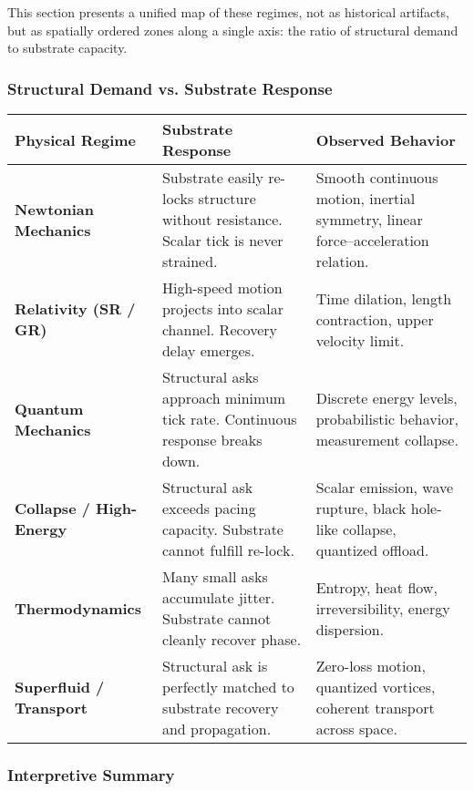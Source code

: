 \documentclass[entropy,article,submit,pdftex,moreauthors]{Definitions/mdpi}
\begin{document}
This section presents a unified map of these regimes, not as historical artifacts, but as spatially ordered zones along a single axis: the ratio of structural demand to substrate capacity.

\subsubsection*{Structural Demand vs. Substrate Response}

\begin{center}
\renewcommand{\arraystretch}{1.4}
\begin{tabular}{|p{3.3cm}|p{4.0cm}|p{5.0cm}|}
\hline
\textbf{Physical Regime} & \textbf{Substrate Response} & \textbf{Observed Behavior} \\
\hline
\textbf{Newtonian Mechanics} & Substrate easily re-locks structure without resistance. Scalar tick is never strained. & Smooth continuous motion, inertial symmetry, linear force–acceleration relation. \\
\hline
\textbf{Relativity (SR / GR)} & High-speed motion projects into scalar channel. Recovery delay emerges. & Time dilation, length contraction, upper velocity limit. \\
\hline
\textbf{Quantum Mechanics} & Structural asks approach minimum tick rate. Continuous response breaks down. & Discrete energy levels, probabilistic behavior, measurement collapse. \\
\hline
\textbf{Collapse / High-Energy} & Structural ask exceeds pacing capacity. Substrate cannot fulfill re-lock. & Scalar emission, wave rupture, black hole-like collapse, quantized offload. \\
\hline
\textbf{Thermodynamics} & Many small asks accumulate jitter. Substrate cannot cleanly recover phase. & Entropy, heat flow, irreversibility, energy dispersion. \\
\hline
\textbf{Superfluid / Transport} & Structural ask is perfectly matched to substrate recovery and propagation. & Zero-loss motion, quantized vortices, coherent transport across space. \\
\hline
\end{tabular}
\end{center}

\vspace{1em}

\subsubsection*{Interpretive Summary}
\end{document}
